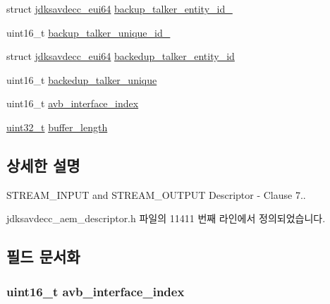\begin{DoxyCompactItemize}
\item 
struct \hyperlink{structjdksavdecc__eui64}{jdksavdecc\+\_\+eui64} \hyperlink{structjdksavdecc__descriptor__stream_a8cd30b747ffe42bbbb9e89686bfe349e}{backup\+\_\+talker\+\_\+entity\+\_\+id\+\_}
\item 
uint16\+\_\+t \hyperlink{structjdksavdecc__descriptor__stream_a97e0bf5439ef92d3caaf24ce5d5bcb7e}{backup\+\_\+talker\+\_\+unique\+\_\+id\+\_}
\item 
struct \hyperlink{structjdksavdecc__eui64}{jdksavdecc\+\_\+eui64} \hyperlink{structjdksavdecc__descriptor__stream_a218e3249603c8b6c32ed14bbbb1e0b30}{backedup\+\_\+talker\+\_\+entity\+\_\+id}
\item 
uint16\+\_\+t \hyperlink{structjdksavdecc__descriptor__stream_a771e4d5f3cd01acbe4a885e46a888722}{backedup\+\_\+talker\+\_\+unique}
\item 
uint16\+\_\+t \hyperlink{structjdksavdecc__descriptor__stream_aabf36ae1d50a1f7310c54c6b30a2a62d}{avb\+\_\+interface\+\_\+index}
\item 
\hyperlink{parse_8c_a6eb1e68cc391dd753bc8ce896dbb8315}{uint32\+\_\+t} \hyperlink{structjdksavdecc__descriptor__stream_add2e144e8eb02e9b6cce22e494b64db6}{buffer\+\_\+length}
\end{DoxyCompactItemize}


\subsection{상세한 설명}
S\+T\+R\+E\+A\+M\+\_\+\+I\+N\+P\+UT and S\+T\+R\+E\+A\+M\+\_\+\+O\+U\+T\+P\+UT Descriptor -\/ Clause 7.. 

jdksavdecc\+\_\+aem\+\_\+descriptor.\+h 파일의 11411 번째 라인에서 정의되었습니다.



\subsection{필드 문서화}
\subsubsection[{\texorpdfstring{avb\+\_\+interface\+\_\+index}{avb_interface_index}}]{\setlength{\rightskip}{0pt plus 5cm}uint16\+\_\+t avb\+\_\+interface\+\_\+index}\hypertarget{structjdksavdecc__descriptor__stream_aabf36ae1d50a1f7310c54c6b30a2a62d}{}\label{structjdksavdecc__descriptor__stream_aabf36ae1d50a1f7310c54c6b30a2a62d}


